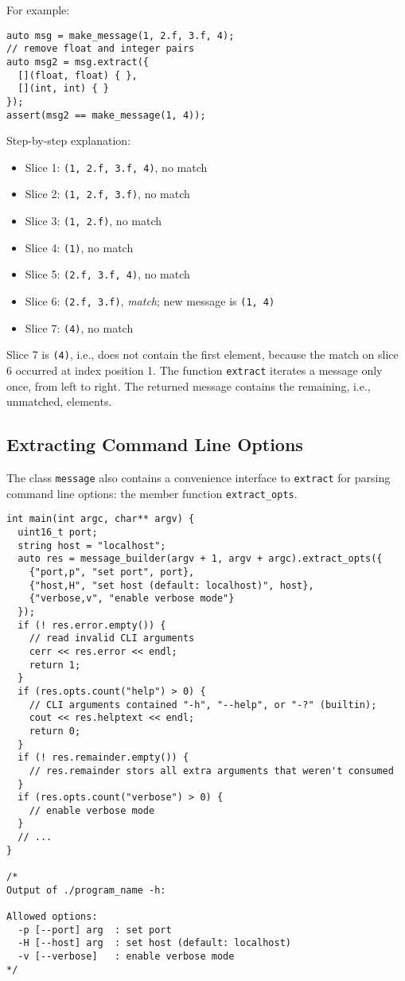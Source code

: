 For example:

\begin{lstlisting}
auto msg = make_message(1, 2.f, 3.f, 4);
// remove float and integer pairs
auto msg2 = msg.extract({
  [](float, float) { },
  [](int, int) { }
});
assert(msg2 == make_message(1, 4));
\end{lstlisting}

Step-by-step explanation:

\begin{itemize}
  \item Slice 1: \lstinline^(1, 2.f, 3.f, 4)^, no match
  \item Slice 2: \lstinline^(1, 2.f, 3.f)^, no match
  \item Slice 3: \lstinline^(1, 2.f)^, no match
  \item Slice 4: \lstinline^(1)^, no match
  \item Slice 5: \lstinline^(2.f, 3.f, 4)^, no match
  \item Slice 6: \lstinline^(2.f, 3.f)^, \emph{match}; new message is \lstinline^(1, 4)^
  \item Slice 7: \lstinline^(4)^, no match
\end{itemize}

Slice 7 is \lstinline^(4)^, i.e., does not contain the first element, because
the match on slice 6 occurred at index position 1. The function
\lstinline^extract^ iterates a message only once, from left to right. The
returned message contains the remaining, i.e., unmatched, elements.

\clearpage
\subsection{Extracting Command Line Options}
\label{extract-opts}

The class \lstinline^message^ also contains a convenience interface to
\lstinline^extract^ for parsing command line options: the member function
\lstinline^extract_opts^.

\begin{lstlisting}
int main(int argc, char** argv) {
  uint16_t port;
  string host = "localhost";
  auto res = message_builder(argv + 1, argv + argc).extract_opts({
    {"port,p", "set port", port},
    {"host,H", "set host (default: localhost)", host},
    {"verbose,v", "enable verbose mode"}
  });
  if (! res.error.empty()) {
    // read invalid CLI arguments
    cerr << res.error << endl;
    return 1;
  }
  if (res.opts.count("help") > 0) {
    // CLI arguments contained "-h", "--help", or "-?" (builtin);
    cout << res.helptext << endl;
    return 0;
  }
  if (! res.remainder.empty()) {
    // res.remainder stors all extra arguments that weren't consumed
  }
  if (res.opts.count("verbose") > 0) {
    // enable verbose mode
  }
  // ...
}

/*
Output of ./program_name -h:

Allowed options:
  -p [--port] arg  : set port
  -H [--host] arg  : set host (default: localhost)
  -v [--verbose]   : enable verbose mode
*/
\end{lstlisting}
